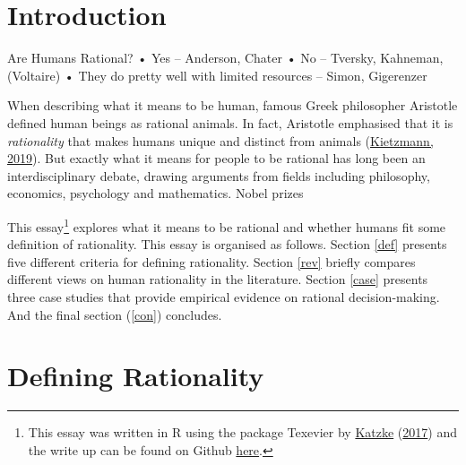 \documentclass[11pt,preprint, authoryear]{elsarticle}
\numberwithin{equation}{section}
\numberwithin{figure}{section}
\numberwithin{table}{section}
\let\rmarkdownfootnote\footnote%
\def\footnote{\protect\rmarkdownfootnote}
\begin{document}
\renewcommand{\contentsname}{Table of Contents}
{\tableofcontents}

\pagestyle{fancy}
\chead{}
\rhead{}
\lfoot{}
\lhead{}
\cfoot{}


\headsep 35pt %




\newpage

\hypertarget{introduction}{%
\section{\texorpdfstring{Introduction
\label{Introduction}}{Introduction }}\label{introduction}}

Are Humans Rational? • Yes -- Anderson, Chater • No -- Tversky,
Kahneman, (Voltaire) • They do pretty well with limited resources --
Simon, Gigerenzer

When describing what it means to be human, famous Greek philosopher
Aristotle defined human beings as rational animals. In fact, Aristotle
emphasised that it is \emph{rationality} that makes humans unique and
distinct from animals (\protect\hyperlink{ref-aristotle}{Kietzmann,
2019}). But exactly what it means for people to be rational has long
been an interdisciplinary debate, drawing arguments from fields
including philosophy, economics, psychology and mathematics. Nobel
prizes

This essay\footnote{This essay was written in R using the package
  Texevier by \protect\hyperlink{ref-Texevier}{Katzke}
  (\protect\hyperlink{ref-Texevier}{2017}) and the write up can be found
  on Github \href{https://github.com/cass-code/Phil_essay}{here}.}
explores what it means to be rational and whether humans fit some
definition of rationality. This essay is organised as follows. Section
\ref{def} presents five different criteria for defining rationality.
Section \ref{rev} briefly compares different views on human rationality
in the literature. Section \ref{case} presents three case studies that
provide empirical evidence on rational decision-making. And the final
section (\ref{con}) concludes.

\hypertarget{defining-rationality}{%
\section{\texorpdfstring{Defining Rationality
\label{def}}{Defining Rationality }}\label{defining-rationality}}
\end{document}
